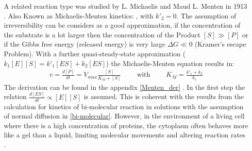 \documentclass[
  a4paper,BCOR10mm,oneside,
  bibtotoc,idxtotoc,
  headsepline,footsepline,%
  fleqn,openbib
]{scrbook}
\begin{document}
\newline
A related reaction type was studied by L. Michaelis and Maud L. Menten in 1913 \cite{Johnson2011}. Also Known as Michaelis-Menten kinetics:   
, with $k'_{\mathrm{2}}=0$. The assumption of irreversibility can be considers as a good approximation, if the concentration of the substrate  is a lot larger then the concentration of the Product $[S]\gg[P]$ or if the Gibbs free energy (released energy) is very large  $\Delta G \ll 0$ (Kramer's escape Problem). With a further quasi-steady-state approximation  ($k_{\mathrm{1}}[E][S]=k'_{\mathrm{1}}[ES]+k_{\mathrm{2}}[ES]$) the Michaelis-Menten equation results in:
\begin{align}
 v= \frac{d[P]}{dt}=V_{max} \frac{[S]}{K_M+[S]}  \qquad \text{ with } \qquad K_M=\frac{k'_{\mathrm{1}}+k_{\mathrm{2}}}{k_{\mathrm{1}}}
\end{align}
The derivation can be found in the appendix \ref{Menten_der} . In the first step the relation $\frac{d[ES]}{dt}\propto [E][S]$ is assumed. This is coherent with the results from the calculation for kinetics of bi-molecular reaction in solutions with the assumption of normal diffusion in \cref{bi-molecular}. However, in the environment of a living cell where there is a high concentration of proteins, the cytoplasm often behaves more like a gel than a liquid, limiting molecular movements and altering reaction rates \cite{Zhou2008}.

\end{document}

